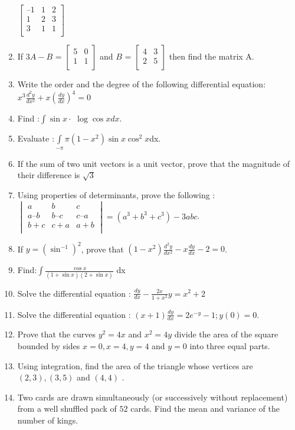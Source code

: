 \documentclass{article}
\begin{document}
\begin{enumerate}
$\begin{bmatrix}
    –1 & 1 & 2  \\
     1 & 2 & 3  \\
     3 & 1 & 1  \\
\end{bmatrix}$
\item If $3A-B$ =
$\begin{bmatrix}
    5 & 0 \\
    1 & 1 \\    
\end{bmatrix}$ and $B$ =
$\begin{bmatrix}
    4 & 3 \\
    2 & 5 \\
\end{bmatrix}$ then find the matrix A.
\item Write the order and the degree of the following differential equation: $x^3\frac{d^2y}{dx^2} +x(\frac{dy}{dx})^4 = 0 $
\item Find :$\int \sin x\cdot$ $\log\cos x dx.$
\item Evaluate :$\int\limits_{-\pi}{\pi}(1-x^2)\sin x \cos^2x$dx.


    \item If the sum of two unit vectors is a unit vector, prove that the magnitude of their
difference is $\sqrt{3}$
\item Using properties of determinants, prove the following : 
$\begin{vmatrix}
    a & b & c \\
    a – b & b – c & c – a \\
    b + c & c + a & a + b \\
\end{vmatrix} = (a^3+b^3+c^3)-3abc$.
\item If $y=(\sin^{-1})^2$, prove that $(1-x^2)\frac{d^2y}{dx^2}-x \frac{dy}{dx}-2=0$.
\item Find:$\int\frac{\cos x}{(1 + \sin x)(2 + \sin x)}$ dx
\item Solve the differential equation : $\frac{dy}{dx} - \frac{2x}{1+x^2}y = x^2 + 2$
\item Solve the differential equation : $(x+1)\frac{dy}{dx} =2e^{-y}-1;y(0)=0$.
\item Prove that the curves $y^2 = 4x$ and $x^2 = 4y$ divide the area of the square bounded by sides $x = 0, x = 4, y = 4$ and $y = 0$ into three equal parts. 
\item Using integration, find the area of the triangle whose vertices are $(2, 3), (3, 5)$ and $(4, 4)$ .
\item Two cards are drawn simultaneously (or successively without replacement) from a
well shuffled pack of $52$ cards. Find the mean and variance of the number of kings.
\end{enumerate}
\end{document}

